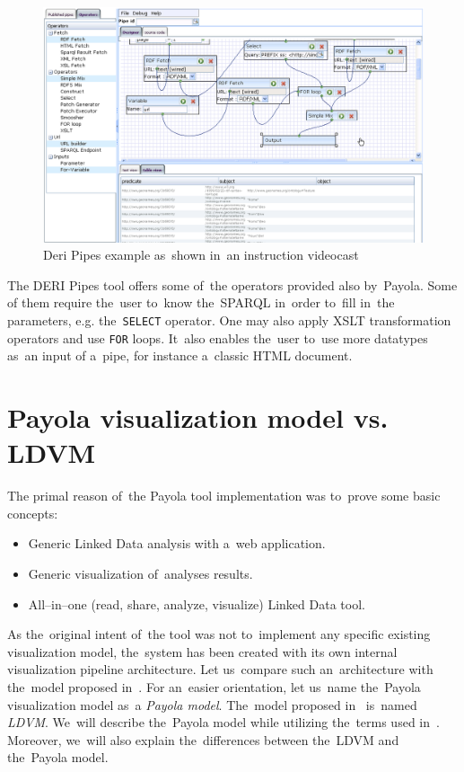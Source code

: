 \begin{figure}
	\centering
	\includegraphics[width=140mm]{img/deri.png}
	\caption{Deri Pipes example as~shown in~an instruction videocast~\cite{deri-screen-source}}
	\label{fig:deri}
\end{figure}

The DERI Pipes tool offers some of~the operators provided also by~Payola. Some 
of them require the~user to~know the~SPARQL in~order to~fill in~the 
parameters, e.g. the~\texttt{SELECT} operator. One may also apply XSLT 
transformation operators and use \texttt{FOR} loops. It~also enables the~user to~use more datatypes as~an input 
of a~pipe, for instance a~classic HTML document.

\section{Payola visualization model vs. LDVM}
\label{sec:rw:ldvm}
The primal reason of~the Payola tool implementation was to~prove some basic concepts:

\begin{itemize}
\item Generic Linked Data analysis with a~web application.
\item Generic visualization of~analyses results.
\item All--in--one (read, share, analyze, visualize) Linked Data tool.
\end{itemize}

As the~original intent of~the tool was not to~implement any specific existing visualization model,
the~system has been created with its own internal visualization pipeline architecture. Let us~compare such
an~architecture with the~model proposed in~\cite{ldvm}. For an~easier orientation, let us~name the~Payola visualization 
model as~a \emph{Payola model}. The~model proposed in~\cite{ldvm} is~named \emph{LDVM}. We~will describe the~Payola
model while utilizing the~terms used in~\cite{ldvm}. Moreover, we~will also explain
the~differences between the~LDVM and the~Payola model.

